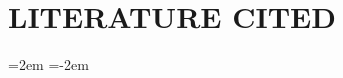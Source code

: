 \section*{LITERATURE CITED}

\begingroup

\normalsize
\leftskip=2em
\parindent=-2em

\begin{verbatim}
\end{verbatim}




\endgroup
\clearpage
